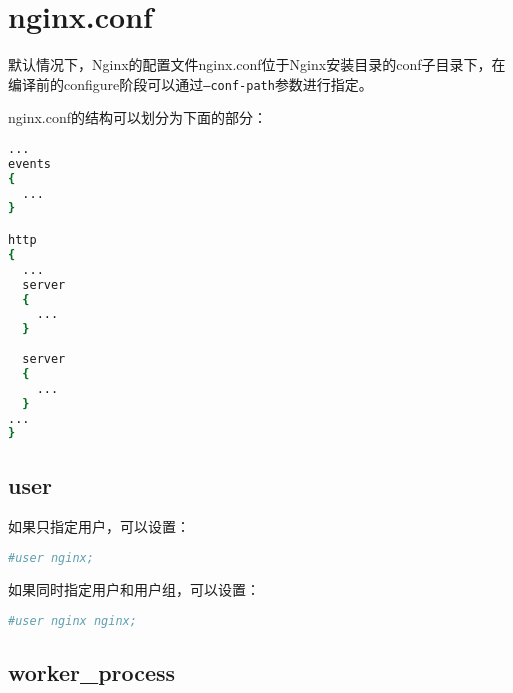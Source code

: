 \begin{lstlisting}[language=bash]

\end{lstlisting}




\begin{lstlisting}[language=bash]

\end{lstlisting}




\begin{lstlisting}[language=bash]

\end{lstlisting}


\chapter{nginx.conf}

默认情况下，Nginx的配置文件nginx.conf位于Nginx安装目录的conf子目录下，在编译前的configure阶段可以通过\texttt{--conf-path}参数进行指定。

nginx.conf的结构可以划分为下面的部分：

\begin{lstlisting}[language=bash]
...
events
{
  ...
}

http
{
  ...
  server
  {
    ...
  }
  
  server
  {
    ...
  }
...
}


\end{lstlisting}

\section{user}



\begin{compactitem}
\item 如果只指定用户，可以设置：

\begin{lstlisting}[language=bash]
#user nginx;
\end{lstlisting}

\item 如果同时指定用户和用户组，可以设置：

\begin{lstlisting}[language=bash]
#user nginx nginx;
\end{lstlisting}
\end{compactitem}


\section{worker\_process}

